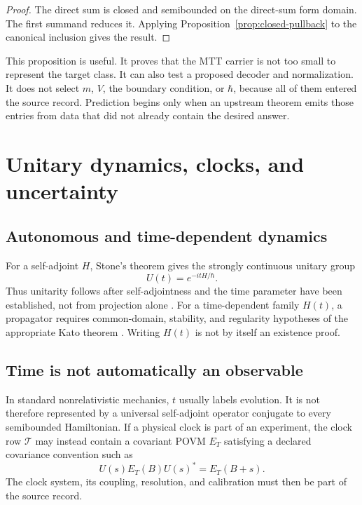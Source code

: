 \documentclass[11pt]{article}
\theoremstyle{definition}
\theoremstyle{remark}
\newcommand{\cT}{\mathcal T}
\begin{document}
\begin{proof}
The direct sum is closed and semibounded on the direct-sum form domain.
The first summand reduces it. Applying Proposition~\ref{prop:closed-pullback} to the
canonical inclusion gives the result.
\end{proof}

This proposition is useful.  It proves that the MTT carrier is not too small
to represent the target class.  It can also test a proposed decoder and
normalization.  It does not select \(m\), \(V\), the boundary condition, or
\(\hbar\), because all of them entered the source record.  Prediction begins
only when an upstream theorem emits those entries from data that did not
already contain the desired answer.

\section{Unitary dynamics, clocks, and uncertainty}
\label{sec:time}

\subsection{Autonomous and time-dependent dynamics}

For a self-adjoint \(H\), Stone's theorem gives the strongly continuous
unitary group
\[
U(t)=e^{-itH/\hbar}.
\]
Thus unitarity follows after self-adjointness and the time parameter have
been established, not from projection alone \cite{Stone1932,ReedSimon1972}.
For a time-dependent family \(H(t)\), a propagator requires common-domain,
stability, and regularity hypotheses of the appropriate Kato theorem
\cite{Kato1995}.  Writing \(H(t)\) is not by itself an existence proof.

\subsection{Time is not automatically an observable}

In standard nonrelativistic mechanics, \(t\) usually labels evolution.  It is
not therefore represented by a universal self-adjoint operator conjugate to
every semibounded Hamiltonian.  If a physical clock is part of an
experiment, the clock row \(\cT\) may instead contain a covariant POVM
\(E_T\) satisfying a declared covariance convention such as
\[
U(s)E_T(B)U(s)^*=E_T(B+s).
\]
The clock system, its coupling, resolution, and calibration must then be
part of the source record.
\end{document}
